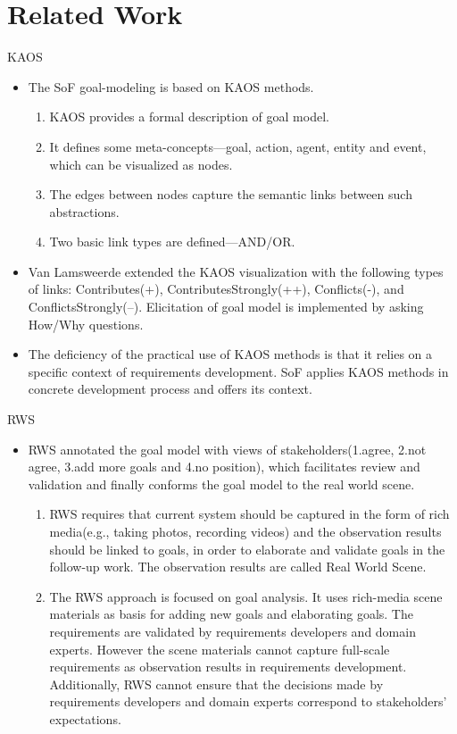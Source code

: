 ﻿\documentclass{beamer}
\begin{document}
\section{Related Work}
\begin{frame}    {KAOS}               %
  \small{
  \begin{itemize} 
  \item The SoF goal-modeling is based on KAOS methods. \pause
    \begin{enumerate}
    \item KAOS provides a formal description of goal model. 
    \item It defines some meta-concepts—goal, action, agent, entity and event, which can be visualized as nodes.
    \item The edges between nodes capture the semantic links between such abstractions.
    \item Two basic link types are defined—AND/OR.\pause
    \end{enumerate}
  \item
    Van Lamsweerde extended the KAOS visualization with the following types of links: Contributes(+), ContributesStrongly(++), Conflicts(-), and ConflictsStrongly(--). Elicitation of goal model is implemented by asking How/Why questions.\pause
  \item
    The deficiency of the practical use of KAOS methods is that it relies on a specific context of requirements development. SoF applies KAOS methods in concrete development process and offers its context.\pause
  \end{itemize}
  }
\end{frame}


\begin{frame}  {RWS}               %
  \footnotesize{
  \begin{itemize}
  \item RWS annotated the goal model with views of stakeholders(1.agree, 2.not agree, 3.add more goals and 4.no position), which facilitates review and validation and finally conforms the goal model to the real world scene.\pause
    \begin{enumerate}
    \item RWS requires that current system should be captured in the form of rich media(e.g., taking photos, recording videos) and the observation results should be linked to goals, in order to elaborate and validate goals in the follow-up work. The observation results are called Real World Scene. \pause
    \item The RWS approach is focused on goal analysis. It uses rich-media scene materials as basis for adding new goals and elaborating goals. The requirements are validated by requirements developers and domain experts. However the scene materials cannot capture full-scale requirements as observation results in requirements development. Additionally, RWS cannot ensure that the decisions made by requirements developers and domain experts correspond to stakeholders' expectations. \pause
    \end{enumerate}
  \end{itemize}
  }
\end{frame}  
\end{document}
